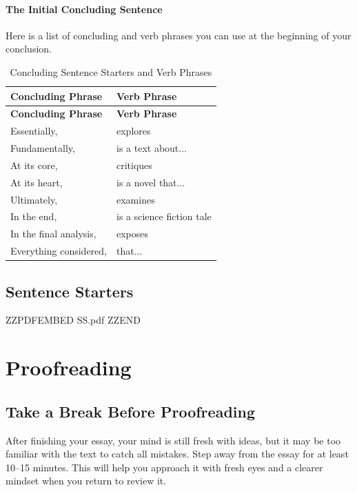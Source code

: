 \documentclass[a4paper]{article}
\begin{document}
\paragraph{The Initial Concluding Sentence}
Here is a list of concluding and verb phrases you can use at the beginning of your conclusion.

\begin{longtable}{|p{5cm}|p{5cm}|}
\caption{Concluding Sentence Starters and Verb Phrases} \label{tab:conclusionphrases} \\
\hline
\textbf{Concluding Phrase} & \textbf{Verb Phrase} \\
\hline
\endfirsthead

\hline
\textbf{Concluding Phrase} & \textbf{Verb Phrase} \\
\hline
\endhead

\hline
\endfoot

Essentially,             & explores \\
Fundamentally,           & is a text about... \\
At its core,             & critiques \\
At its heart,            & is a novel that... \\
Ultimately,              & examines \\
In the end,              & is a science fiction tale \\
In the final analysis,   & exposes \\
Everything considered,   & that... \\
\hline

\end{longtable}

\subsection{Sentence Starters}


ZZPDFEMBED SS.pdf ZZEND




\cleardoublepage

\clearpage
\thispagestyle{empty}
\hfill
\clearpage

\section{Proofreading}

\subsection{Take a Break Before Proofreading}
After finishing your essay, your mind is still fresh with ideas, but it may be too familiar with the text to catch all mistakes. Step away from the essay for at least 10–15 minutes. This will help you approach it with fresh eyes and a clearer mindset when you return to review it.
\end{document}
